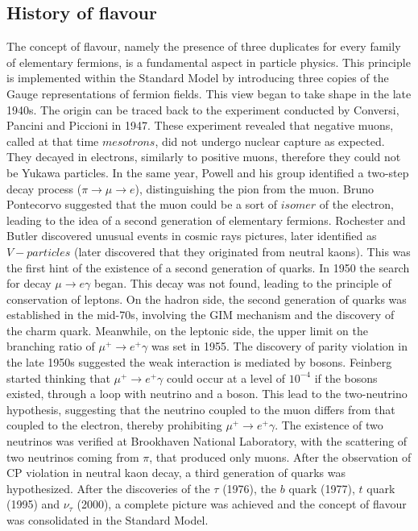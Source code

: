 \subsection{History of flavour}
The concept of flavour, namely the presence of three duplicates for every family of elementary fermions, is a fundamental aspect in particle physics. 
This principle is implemented within the Standard Model by introducing three copies of the Gauge representations of fermion fields. This view began 
to take shape in the late 1940s. The origin can be traced back to the experiment conducted by Conversi, Pancini and Piccioni in 1947. These experiment 
revealed that negative muons, called at that time $mesotrons$, did not undergo nuclear capture as expected. They decayed in electrons, similarly to positive muons, 
therefore they could not be Yukawa particles. In the same year, Powell and his group identified a two-step decay process ($\pi \rightarrow \mu \rightarrow e$), 
distinguishing the pion from the muon. Bruno Pontecorvo suggested that the muon could be a sort of $isomer$ of the electron, leading to the idea of a second 
generation of elementary fermions. Rochester and Butler discovered unusual events in cosmic rays pictures, later identified as $V-particles$ (later 
discovered that they originated from neutral kaons). This was the first hint of the existence of a second generation of quarks. In 1950 the search 
for decay $\mu \rightarrow e \gamma$ began. This decay was not found, leading to the principle of conservation of leptons. On the hadron side, 
the second generation of quarks was established in the mid-70s, involving the GIM mechanism and the discovery of the charm quark. Meanwhile, 
on the leptonic side, the upper limit on the branching ratio of $\mu^+ \rightarrow  e^+ \gamma$ was set in 1955. The discovery of parity violation 
in the late 1950s suggested the weak interaction is mediated by bosons. Feinberg started thinking that $\mu^+ \rightarrow  e^+ \gamma$ could occur 
at a level of $10^{-4}$ if the bosons existed, through a loop with neutrino and a boson. This lead to the two-neutrino hypothesis, suggesting that 
the neutrino coupled to the muon differs from that coupled to the electron, thereby prohibiting $\mu^+ \rightarrow  e^+ \gamma$. The existence of 
two neutrinos was verified at Brookhaven National Laboratory, with the scattering of two neutrinos coming from $\pi$, that produced only muons. 
After the observation of CP violation in neutral kaon decay, a third generation of quarks was hypothesized. After the discoveries of the $\tau$ (1976), 
the $b$ quark (1977), $t$ quark (1995) and $\nu_{\tau}$ (2000), a complete picture was achieved and the concept of flavour was consolidated in the Standard Model.


